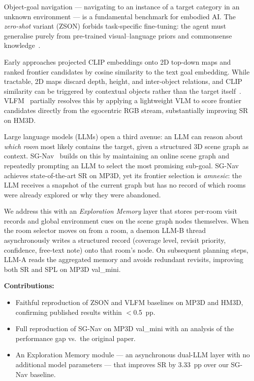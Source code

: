 \documentclass[10pt,twocolumn,letterpaper]{article}
\begin{document}
Object-goal navigation --- navigating to an instance of a target category in
an unknown environment --- is a fundamental benchmark for embodied AI.
The \emph{zero-shot} variant (ZSON) forbids task-specific fine-tuning: the
agent must generalise purely from pre-trained visual--language priors and
commonsense knowledge~\cite{majumdar2022zson}.

Early approaches projected CLIP embeddings onto 2D top-down maps and ranked
frontier candidates by cosine similarity to the text goal embedding.
While tractable, 2D maps discard depth, height, and inter-object relations,
and CLIP similarity can be triggered by contextual objects rather than the
target itself~\cite{gadre2023cow}.
VLFM~\cite{yokoyama2024vlfm} partially resolves this by applying a
lightweight VLM to score frontier candidates directly from the egocentric
RGB stream, substantially improving SR on HM3D.

Large language models (LLMs) open a third avenue: an LLM can reason
about \emph{which room} most likely contains the target, given a structured
3D scene graph as context.
SG-Nav~\cite{yin2024sgnav} builds on this by maintaining an online scene
graph and repeatedly prompting an LLM to select the most promising sub-goal.
SG-Nav achieves state-of-the-art SR on MP3D, yet its frontier selection is
\emph{amnesic}: the LLM receives a snapshot of the current graph but has no
record of which rooms were already explored or why they were abandoned.

We address this with an \emph{Exploration Memory} layer that stores
per-room visit records and global environment cues on the scene graph nodes
themselves.
When the room selector moves on from a room, a daemon LLM-B thread
asynchronously writes a structured record (coverage level, revisit priority,
confidence, free-text note) onto that room's node.
On subsequent planning steps, LLM-A reads the aggregated memory and avoids
redundant revisits, improving both SR and SPL on MP3D val\_mini.

\noindent\textbf{Contributions:}
\begin{itemize}[leftmargin=1em]
  \item Faithful reproduction of ZSON and VLFM baselines on MP3D and HM3D,
        confirming published results within $<$0.5~pp.
  \item Full reproduction of SG-Nav on MP3D val\_mini with an analysis of the
        performance gap vs.\ the original paper.
  \item An Exploration Memory module --- an asynchronous dual-LLM layer with
        no additional model parameters --- that improves SR by 3.33~pp over
        our SG-Nav baseline.
\end{itemize}
\end{document}
